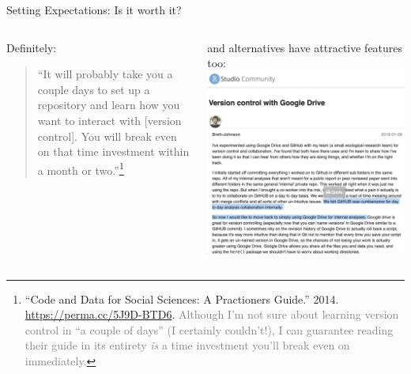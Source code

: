\documentclass[ignorenonframetext, 10pt, aspectratio=169]{beamer}
\begin{document}
\begin{frame}{Setting Expectations: Is it worth it?}
\begin{columns}[T]
\begin{column}{0.5\textwidth}
\begin{minipage}[t]{\linewidth}

Definitely:\\

\begin{quote}
``It will probably take you a couple days to set up a repository and learn how you want to interact with [version control]. You will break even on that time investment within a month or two.''\footnote{\scriptsize ``Code and Data for Social Sciences: A Practioners Guide.'' 2014. \url{https://perma.cc/5J9D-BTD6}.  \textcolor{gray}{Although I'm not sure about learning version control in ``a couple of days'' (I certainly couldn't!), I can guarantee reading their guide in its entirety \emph{is} a time investment you'll break even on immediately.}}\\
\end{quote}

\end{minipage}
\bigskip
\bigskip
\vspace*{\fill}

\end{column}
\begin{column}{0.5\textwidth}
\begin{minipage}[t]{\linewidth}
and alternatives have attractive features too:
\smallskip
\centering
\includegraphics[width = 0.8\linewidth]{github_vs_gdrive.png}
\end{minipage}
\end{column}
\end{columns}
\end{frame}
\end{document}
